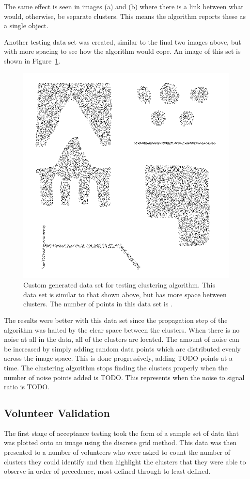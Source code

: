 The same effect is seen in images (a) and (b) where there is a link between
what would, otherwise, be separate clusters. This means the algorithm reports
these as a single object.

Another testing data set was created, similar to the final two images above,
but with more spacing to see how the algorithm would cope. An image of this set
is shown in Figure~\ref{fig:testing-image2a}.

\begin{figure}[tbh]
	\centering
	\includegraphics[width=0.5\linewidth]{testing-image2a.png}
	\caption[Custom generated data set for testing clustering
		algorithm.]{Custom generated data set for testing clustering
		algorithm. This data set is similar to that shown above, but
		has more space between clusters. The number of points in this
		data set is .} \label{fig:testing-image2a}
\end{figure}

The results were better with this data set since the propagation step of the
algorithm was halted by the clear space between the clusters. When there is no
noise at all in the data, all of the clusters are located. The amount of noise
can be increased by simply adding random data points which are distributed
evenly across the image space. This is done progressively, adding TODO points
at a time. The clustering algorithm stops finding the clusters properly when
the number of noise points added is TODO. This represents when the noise to
signal ratio is TODO.

\subsection{Volunteer Validation}
\label{sub:volunteer_validation}

The first stage of acceptance testing took the form of a sample set of data
that was plotted onto an image using the discrete grid method. This data was
then presented to a number of volunteers who were asked to count the number of
clusters they could identify and then highlight the clusters that they were
able to observe in order of precedence, most defined through to least defined.

